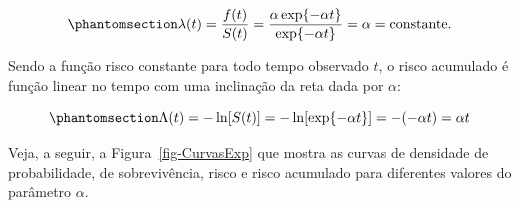 \documentclass[
  12pt,
  letterpaper,
  DIV=11,
  numbers=noendperiod]{scrreprt}
\begin{document}
\begin{equation}\phantomsection\label{eq-RiscoExp}{
\lambda(t) = \dfrac{f(t)}{S(t)} = \dfrac{\alpha \exp\{ -\alpha t \}}{\exp\{ -\alpha t \}} = \alpha = \text{constante}.
}\end{equation}

Sendo a função risco constante para todo tempo observado \(t\), o risco
acumulado é função linear no tempo com uma inclinação da reta dada por
\(\alpha\):

\begin{equation}\phantomsection\label{eq-RiscoAcumExp}{
\Lambda(t) = - \ln[S(t)] = - \ln[ \exp\{ -\alpha t \} ] = - (- \alpha t) = \alpha t
}\end{equation}

Veja, a seguir, a Figura~\ref{fig-CurvasExp} que mostra as curvas de
densidade de probabilidade, de sobrevivência, risco e risco acumulado
para diferentes valores do parâmetro \(\alpha\).
\end{document}
